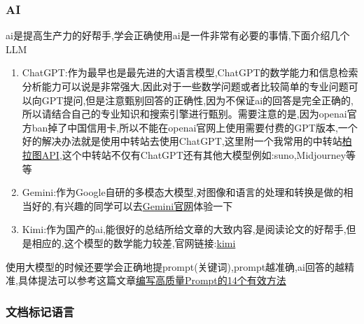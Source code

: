\documentclass{ctexart}
\begin{document}
\subsubsection{AI}
ai是提高生产力的好帮手,学会正确使用ai是一件非常有必要的事情,下面介绍几个LLM
\begin{enumerate}
    \item ChatGPT:作为最早也是最先进的大语言模型,ChatGPT的数学能力和信息检索分析能力可以说是非常强大,因此对于一些数学问题或者比较简单的专业问题可以向GPT提问,但是注意甄别回答的正确性,因为不保证ai的回答是完全正确的,所以请结合自己的专业知识和搜索引擎进行甄别。需要注意的是,因为openai官方ban掉了中国信用卡,所以不能在openai官网上使用需要付费的GPT版本,一个好的解决办法就是使用中转站去使用ChatGPT,这里附一个我常用的中转站\href{https://api.bltcy.ai/}{柏拉图API},这个中转站不仅有ChatGPT还有其他大模型例如:suno,Midjourney等等
    \item Gemini:作为Google自研的多模态大模型,对图像和语言的处理和转换是做的相当好的,有兴趣的同学可以去\href{https://gemini.google.com/app?hl=zh-cn}{Gemini官网}体验一下
    \item Kimi:作为国产的ai,能很好的总结所给文章的大致内容,是阅读论文的好帮手,但是相应的,这个模型的数学能力较差,官网链接:\href{https://kimi.moonshot.cn/}{kimi}
\end{enumerate}
\par 使用大模型的时候还要学会正确地提prompt(关键词),prompt越准确,ai回答的越精准,具体提法可以参考这篇文章\href{https://zhuanlan.zhihu.com/p/660369244}{编写高质量Prompt的14个有效方法
}
\subsubsection{文档标记语言}
\end{document}
